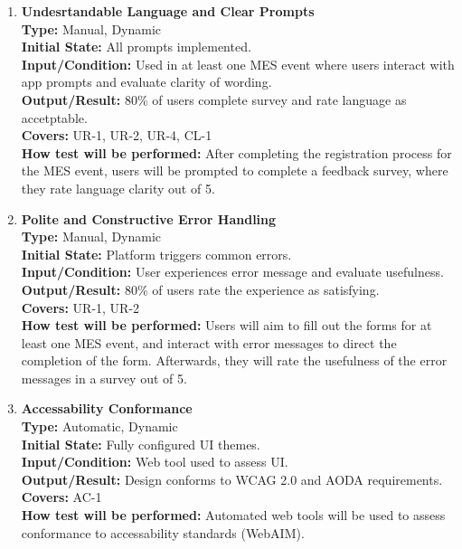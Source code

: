 \documentclass[12pt, titlepage]{article}
\begin{document}
\begin{enumerate}[label=\bfseries UH-\arabic*:, wide=0pt]
  \item \label{test-UH4} \textbf{Undesrtandable Language and Clear Prompts}\\[2mm]
    {\bf Type:} Manual, Dynamic\\
    {\bf Initial State:} All prompts implemented.\\
    {\bf Input/Condition:} Used in at least one MES event where users interact with app prompts and evaluate clarity of wording.\\
    {\bf Output/Result:} 80\% of users complete survey and rate language as accetptable.\\
    {\bf Covers:} UR-1, UR-2, UR-4, CL-1\\
    {\bf How test will be performed:} After completing the registration process for the MES event, users will be prompted to complete a feedback survey, where they rate language clarity out of 5.

  \item \label{test-UH5} \textbf{Polite and Constructive Error Handling}\\[2mm]
    {\bf Type:} Manual, Dynamic\\
    {\bf Initial State:} Platform triggers common errors.\\
    {\bf Input/Condition:} User experiences error message and evaluate usefulness.\\
    {\bf Output/Result:} 80\% of users rate the experience as satisfying.\\
    {\bf Covers:} UR-1, UR-2\\
    {\bf How test will be performed:} Users will aim to fill out the forms for at least one MES event, and interact with error messages to direct the completion of the form. Afterwards, they will rate the usefulness of the error messages in a survey out of 5.
  
  \item \label{test-UH6} \textbf{Accessability Conformance}\\[2mm]
    {\bf Type:} Automatic, Dynamic\\
    {\bf Initial State:} Fully configured UI themes.\\
    {\bf Input/Condition:} Web tool used to assess UI.\\
    {\bf Output/Result:} Design conforms to WCAG 2.0 and AODA requirements.\\
    {\bf Covers:} AC-1\\
    {\bf How test will be performed:} Automated web tools will be used to assess conformance to accessability standards (WebAIM). 
\end{enumerate}
\end{document}
